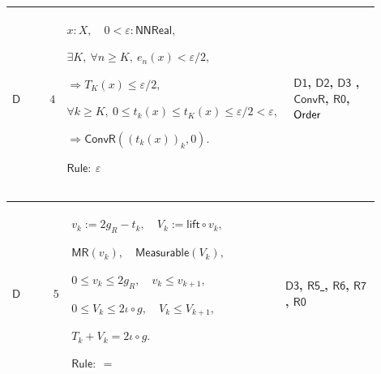 \documentclass[12pt,reqno]{amsart}
\theoremstyle{blueplain}
\numberwithin{equation}{section}
\begin{document}
{\scriptsize \setlength{\parskip}{0pt}\nointerlineskip
\noindent 
\begin{tabular}{|@{}>{\centering\arraybackslash}m{0.10658\linewidth}|>{\centering\arraybackslash}m{0.03553\linewidth}|>{\centering\arraybackslash}m{0.52105\linewidth}|>{\centering\arraybackslash}m{0.23684\linewidth}|}
\hline
\hypertarget{dct:D4}{$\displaystyle \mathsf{D}$} & $\displaystyle 4$ & $%
\displaystyle x:X,\quad0<\varepsilon:\mathsf{NNReal},$\par$\displaystyle %
\exists K,\ \forall n\ge K,\ e_n(x)<\varepsilon/2,$\par$\displaystyle %
\Rightarrow T_K(x)\le\varepsilon/2,$\par$\displaystyle \forall k\ge K,\ 0\le
t_k(x)\le t_K(x)\le\varepsilon/2<\varepsilon,$\par$\displaystyle \Rightarrow%
\mathsf{ConvR}((t_k(x))_k,0).$\par$\displaystyle \mathsf{Rule}:\ \varepsilon$
& \hyperlink{dct:D1}{$\displaystyle \mathsf{D1}$}, \hyperlink{dct:D2}{$%
\displaystyle \mathsf{D2}$}, \hyperlink{dct:D3}{$\displaystyle \mathsf{D3}$}%
, \hyperlink{dctdef:ConvR}{$\displaystyle \mathsf{ConvR}$}, \hyperlink{dct:R0}%
{$\displaystyle \mathsf{R0}$}, \hyperlink{ax:Order}{$\displaystyle \mathsf{%
Order}$} \\ \hline
\end{tabular}%
}

{\scriptsize \setlength{\parskip}{0pt}\nointerlineskip
\noindent 
\begin{tabular}{|@{}>{\centering\arraybackslash}m{0.10658\linewidth}|>{\centering\arraybackslash}m{0.03553\linewidth}|>{\centering\arraybackslash}m{0.52105\linewidth}|>{\centering\arraybackslash}m{0.23684\linewidth}|}
\hline
\hypertarget{dct:D5}{$\displaystyle \mathsf{D}$} & $\displaystyle 5$ & $%
\displaystyle v_k:=2g_R-t_k,\quad V_k:=\mathsf{lift}\circ v_k,$\par$%
\displaystyle \mathsf{MR}(v_k),\quad\mathsf{Measurable}(V_k),$\par$%
\displaystyle 0\le v_k\le2g_R,\quad v_k\le v_{k+1},$\par$\displaystyle 0\le
V_k\le2\iota\circ g,\quad V_k\le V_{k+1},$\par$\displaystyle %
T_k+V_k=2\iota\circ g.$\par$\displaystyle \mathsf{Rule}:\ =$ & \hyperlink{dct:D3}%
{$\displaystyle \mathsf{D3}$}, \hyperlink{dct:R5}{$\displaystyle \mathsf{R5}$%
}, \hyperlink{dct:R6}{$\displaystyle \mathsf{R6}$}, \hyperlink{dct:R7}{$%
\displaystyle \mathsf{R7}$}, \hyperlink{dct:R0}{$\displaystyle \mathsf{R0}$}
\\ \hline
\end{tabular}%
}
\end{document}
